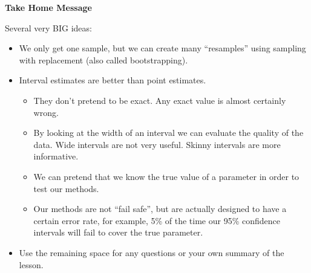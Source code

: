 \begin{center}
  {\large \bf Take Home Message} 
\end{center}

Several very BIG ideas:\vspace{-.8cm}
\begin{itemize}
\item We only get one sample, but we can create many ``resamples''
  using sampling with replacement (also called bootstrapping).

\item Interval estimates are better than point estimates.
  \begin{itemize}
  \item They don't pretend to be exact. Any exact value is almost
    certainly wrong.
  \item By looking at the width of an interval we can evaluate the
    quality of the data.  Wide intervals are not very useful.  Skinny
    intervals are more informative.
  \item We can pretend that we know the true value of a parameter in
    order to test our methods.
  \item Our methods are not ``fail safe'', but are actually designed
    to have a certain error rate, for example, 5\% of the time our
    95\% confidence intervals will fail to cover the true parameter.
  \end{itemize}
 \item 
  Use the remaining space for any questions or your own summary of the
  lesson. 
\end{itemize}



